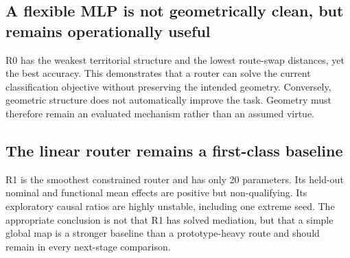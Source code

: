 \documentclass[11pt,a4paper]{article}
\begin{document}
\subsection{A flexible MLP is not geometrically clean, but remains operationally useful}
R0 has the weakest territorial structure and the lowest route-swap distances, yet the best accuracy. This demonstrates that a router can solve the current classification objective without preserving the intended geometry. Conversely, geometric structure does not automatically improve the task. Geometry must therefore remain an evaluated mechanism rather than an assumed virtue.

\subsection{The linear router remains a first-class baseline}
R1 is the smoothest constrained router and has only 20 parameters. Its held-out nominal and functional mean effects are positive but non-qualifying. Its exploratory causal ratios are highly unstable, including one extreme seed. The appropriate conclusion is not that R1 has solved mediation, but that a simple global map is a stronger baseline than a prototype-heavy route and should remain in every next-stage comparison.
\end{document}
